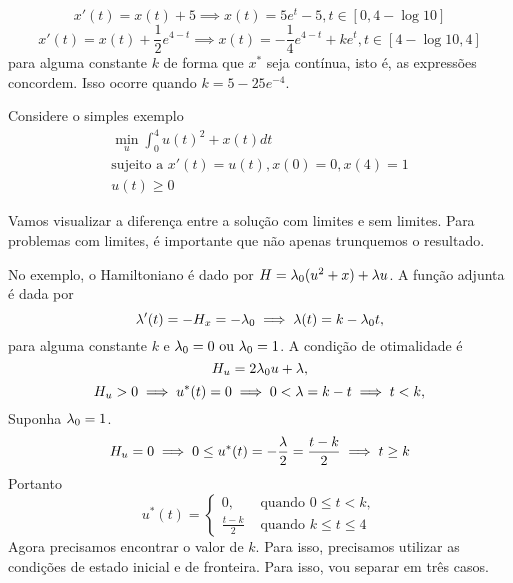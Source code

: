 $$
x'(t) = x(t) + 5 \implies x(t) = 5e^t - 5, t \in [0, 4-\log 10]
$$
$$
x'(t) = x(t) + \frac{1}{2}e^{4-t} \implies x(t) = -\frac{1}{4}e^{4-t} + ke^t, t \in [4 - \log 10, 4]
$$
para alguma constante $k$ de forma que $x^*$ seja contínua, isto é, as
expressões concordem. Isso ocorre quando $k = 5 - 25e^{-4}$. 

\begin{example}
    Considere o simples exemplo 
    \begin{gather*}
        \min_u \int_0^4 u(t)^2 + x(t) dt \\ 
        \text{sujeito a  }x'(t) = u(t), x(0) = 0, x(4) = 1 \\
        u(t) \ge 0 
    \end{gather*}
\end{example}

Vamos visualizar a diferença entre a solução com limites e sem limites. Para
problemas com limites, é importante que não apenas trunquemos o resultado. 

No exemplo, o Hamiltoniano é dado por $H = \lambda_0(u^2 + x) + \lambda u$. A função adjunta
é dada por 
$$\lambda '(t) = - H_x = -\lambda_0 \implies \lambda(t) = k - \lambda_0 t, 
$$
para alguma constante $k$ e $\lambda_0 = 0 \text{ ou } \lambda_0 = 1$. 
A condição de otimalidade é 
$$
H_u = 2\lambda_0 u + \lambda, 
$$
$$
H_u > 0 \implies u^*(t) = 0 \implies 0 < \lambda = k - t \implies t < k,
$$
Suponha $\lambda_0 = 1$.
$$
H_u = 0 \implies 0 \le u^*(t) = -\frac{\lambda}{2} = \frac{t-k}{2} \implies t \ge k
$$
Portanto 
$$
u^*(t) = \begin{cases}
    0, &\text{ quando } 0 \le t < k, \\ 
    \frac{t-k}{2} &\text{ quando } k \le t \le 4
\end{cases}
$$
Agora precisamos encontrar o valor de $k$. Para isso, precisamos utilizar as condições de estado inicial e de fronteira. Para isso, vou separar em três casos. 


